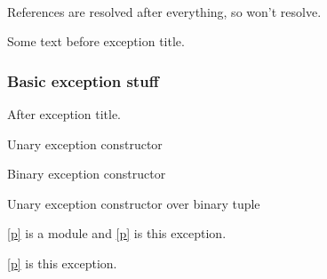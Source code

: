 \label{Ocamlary-module-Buffer}\begin{ocamlindent}\label{Ocamlary-Buffer-val-f}\\
\end{ocamlindent}%
\begin{ocamlindent}References are resolved after everything, so  won't resolve.\end{ocamlindent}%
\medbreak
Some text before exception title.

\subsubsection{Basic exception stuff\label{Ocamlary-basic-exception-stuff}}%
After exception title.

\label{Ocamlary-exception-Kaboom}\begin{ocamlindent}Unary exception constructor\end{ocamlindent}%
\medbreak
\label{Ocamlary-exception-Kablam}\begin{ocamlindent}Binary exception constructor\end{ocamlindent}%
\medbreak
\label{Ocamlary-exception-Kapow}\begin{ocamlindent}Unary exception constructor over binary tuple\end{ocamlindent}%
\medbreak
\label{Ocamlary-exception-EmptySig}\begin{ocamlindent}\hyperref[Ocamlary-module-type-EmptySig]{[p\pageref*{Ocamlary-module-type-EmptySig}]} is a module and \hyperref[Ocamlary-exception-EmptySig]{[p\pageref*{Ocamlary-exception-EmptySig}]} is this exception.\end{ocamlindent}%
\medbreak
\label{Ocamlary-exception-EmptySigAlias}\begin{ocamlindent}\hyperref[Ocamlary-exception-EmptySigAlias]{[p\pageref*{Ocamlary-exception-EmptySigAlias}]} is this exception.\end{ocamlindent}%
\medbreak
